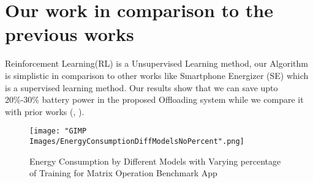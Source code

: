 \documentclass[12pt, twocolumn]{article}
\begin{document}
\section{Our work in comparison to the previous works}
Reinforcement Learning(RL) is a Unsupervised Learning method, our Algorithm is simplistic in comparison to other works like Smartphone Energizer (SE) \cite{khairy2013smartphone} which is a supervised learning method. Our results show that we can save upto 20\%-30\% battery power in the proposed Offloading system while we compare it with prior works (\cite{khairy2013smartphone}, \cite{flores2013adaptive}). 
\begin{figure}[h]
  \centering
  \texttt{[image: "GIMP Images/EnergyConsumptionDiffModelsNoPercent".png]}
  \caption{Energy Consumption by Different Models with Varying percentage of Training for Matrix Operation Benchmark App}
  \label{fig:EnergyConsumptionDiffModelsNoPercent}
\end{figure}


\end{document}
